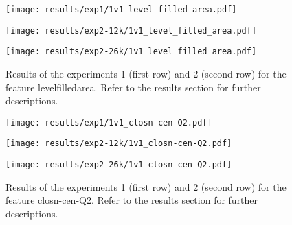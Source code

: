 \begin{figure}[h!]
	\centering
	\begin{minipage}{0.4\linewidth}
		\texttt{[image: results/exp1/1v1\_level\_filled\_area.pdf]}
	\end{minipage}
	
	\begin{minipage}{0.4\linewidth}
		\texttt{[image: results/exp2-12k/1v1\_level\_filled\_area.pdf]}
	\end{minipage}
	\begin{minipage}{0.4\linewidth}
		\texttt{[image: results/exp2-26k/1v1\_level\_filled\_area.pdf]}
	\end{minipage}
	
	\caption[ Results: Feature level\textunderscore filled\textunderscore area]{ Results of the experiments 1 (first row) and 2 (second row) for the feature level\textunderscore filled\textunderscore area. Refer to the results section for further descriptions. }
	\label{fig:appendix_level_filled_area}
\end{figure}

\begin{figure}[h!]
	\centering
	\begin{minipage}{0.4\linewidth}
		\texttt{[image: results/exp1/1v1\_closn-cen-Q2.pdf]}
	\end{minipage}
	
	\begin{minipage}{0.4\linewidth}
		\texttt{[image: results/exp2-12k/1v1\_closn-cen-Q2.pdf]}
	\end{minipage}
	\begin{minipage}{0.4\linewidth}
		\texttt{[image: results/exp2-26k/1v1\_closn-cen-Q2.pdf]}
	\end{minipage}
	
	\caption[ Results: Feature closn-cen-Q2]{ Results of the experiments 1 (first row) and 2 (second row) for the feature closn-cen-Q2. Refer to the results section for further descriptions. }
	\label{fig:appendix_closn-cen-Q2}
\end{figure}
\newpage 


